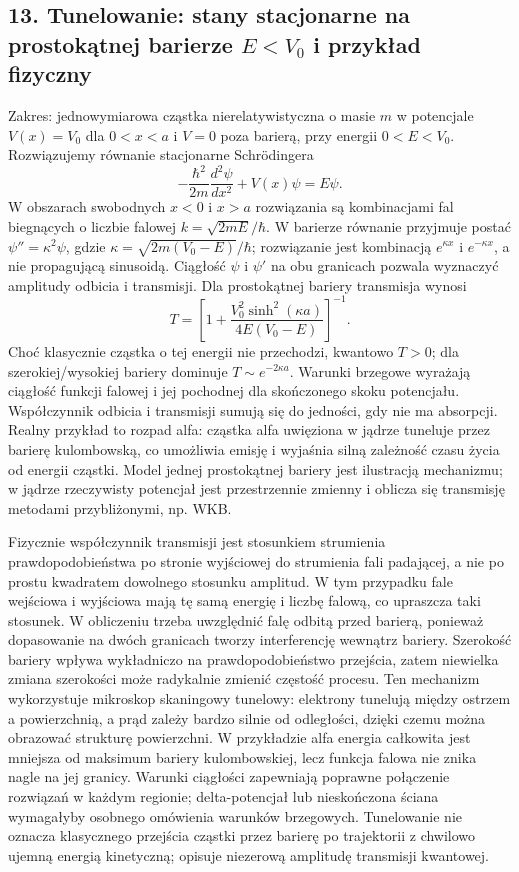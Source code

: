 \documentclass[11pt,a4paper]{article}
\begin{document}
\subsection{13. Tunelowanie: stany stacjonarne na prostokątnej barierze \(E<V_0\) i przykład fizyczny}
Zakres: jednowymiarowa cząstka nierelatywistyczna o masie \(m\) w potencjale \(V(x)=V_0\) dla \(0<x<a\) i \(V=0\) poza barierą, przy energii \(0<E<V_0\). Rozwiązujemy równanie stacjonarne Schrödingera
\[
-\frac{\hbar^2}{2m}\frac{d^2\psi}{dx^2}+V(x)\psi=E\psi.
\]
W obszarach swobodnych \(x<0\) i \(x>a\) rozwiązania są kombinacjami fal biegnących o liczbie falowej \(k=\sqrt{2mE}/\hbar\). W barierze równanie przyjmuje postać \(\psi''=\kappa^2\psi\), gdzie \(\kappa=\sqrt{2m(V_0-E)}/\hbar\); rozwiązanie jest kombinacją \(e^{\kappa x}\) i \(e^{-\kappa x}\), a nie propagującą sinusoidą. Ciągłość \(\psi\) i \(\psi'\) na obu granicach pozwala wyznaczyć amplitudy odbicia i transmisji. Dla prostokątnej bariery transmisja wynosi
\[
T=\left[1+\frac{V_0^2\sinh^2(\kappa a)}{4E(V_0-E)}\right]^{-1}.
\]
Choć klasycznie cząstka o tej energii nie przechodzi, kwantowo \(T>0\); dla szerokiej/wysokiej bariery dominuje \(T\sim e^{-2\kappa a}\). Warunki brzegowe wyrażają ciągłość funkcji falowej i jej pochodnej dla skończonego skoku potencjału. Współczynnik odbicia i transmisji sumują się do jedności, gdy nie ma absorpcji. Realny przykład to rozpad alfa: cząstka alfa uwięziona w jądrze tuneluje przez barierę kulombowską, co umożliwia emisję i wyjaśnia silną zależność czasu życia od energii cząstki. Model jednej prostokątnej bariery jest ilustracją mechanizmu; w jądrze rzeczywisty potencjał jest przestrzennie zmienny i oblicza się transmisję metodami przybliżonymi, np. WKB.

Fizycznie współczynnik transmisji jest stosunkiem strumienia prawdopodobieństwa po stronie wyjściowej do strumienia fali padającej, a nie po prostu kwadratem dowolnego stosunku amplitud. W tym przypadku fale wejściowa i wyjściowa mają tę samą energię i liczbę falową, co upraszcza taki stosunek. W obliczeniu trzeba uwzględnić falę odbitą przed barierą, ponieważ dopasowanie na dwóch granicach tworzy interferencję wewnątrz bariery. Szerokość bariery wpływa wykładniczo na prawdopodobieństwo przejścia, zatem niewielka zmiana szerokości może radykalnie zmienić częstość procesu. Ten mechanizm wykorzystuje mikroskop skaningowy tunelowy: elektrony tunelują między ostrzem a powierzchnią, a prąd zależy bardzo silnie od odległości, dzięki czemu można obrazować strukturę powierzchni. W przykładzie alfa energia całkowita jest mniejsza od maksimum bariery kulombowskiej, lecz funkcja falowa nie znika nagle na jej granicy. Warunki ciągłości zapewniają poprawne połączenie rozwiązań w każdym regionie; delta-potencjał lub nieskończona ściana wymagałyby osobnego omówienia warunków brzegowych. Tunelowanie nie oznacza klasycznego przejścia cząstki przez barierę po trajektorii z chwilowo ujemną energią kinetyczną; opisuje niezerową amplitudę transmisji kwantowej.
\end{document}
